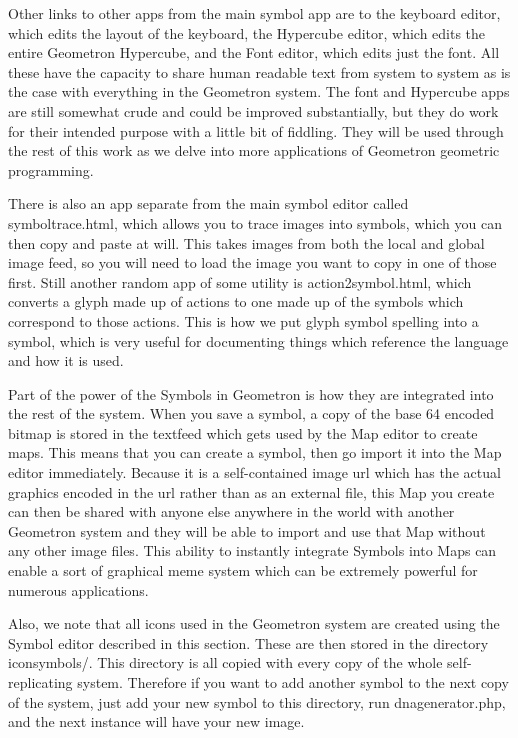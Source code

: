 Other links to other apps from the main symbol app are to the keyboard editor, which edits the layout of the keyboard, the Hypercube editor, which edits the entire Geometron Hypercube, and the Font editor, which edits just the font.  All these have the capacity to share human readable text from system to system as is the case with everything in the Geometron system.  The font and Hypercube apps are still somewhat crude and could be improved substantially, but they do work for their intended purpose with a little bit of fiddling.  They will be used through the rest of this work as we delve into more applications of Geometron geometric programming. 

There is also an app separate from the main symbol editor called symboltrace.html, which allows you to trace images into symbols, which you can then copy and paste at will.  This takes images from both the local and global image feed, so you will need to load the image you want to copy in one of those first.  Still another random app of some utility is action2symbol.html, which converts a glyph made up of actions to one made up of the symbols which correspond to those actions.  This is how we put glyph symbol spelling into a symbol, which is very useful for documenting things which reference the language and how it is used.  

Part of the power of the Symbols in Geometron is how they are integrated into the rest of the system.  When you save a symbol, a copy of the base 64 encoded bitmap is stored in the textfeed which gets used by the Map editor to create maps.  This means that you can create a symbol, then go import it into the Map editor immediately.  Because it is a self-contained image url which has the actual graphics encoded in the url rather than as an external file, this Map you create can then be shared with anyone else anywhere in the world with another Geometron system and they will be able to import and use that Map without any other image files.  This ability to instantly integrate Symbols into Maps can enable a sort of graphical meme system which can be extremely powerful for numerous applications.


Also, we note that all icons used in the Geometron system are created using the Symbol editor described in this section.  These are then stored in the directory iconsymbols/.  This directory is all copied with every copy of the whole self-replicating system.  Therefore if you want to add another symbol to the next copy of the system, just add your new symbol to this directory, run dnagenerator.php, and the next instance will have your new image.

